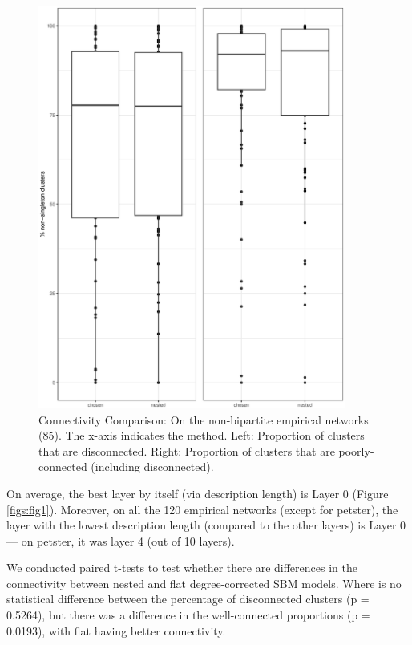 \documentclass[aps,pre,superscriptaddress]{article}
\begin{document}
\begin{figure}[ht]
	\centering
	\begin{subfloat}
		\centering
		\includegraphics[width=0.9\textwidth]{nested_sbm_compar.eps}
	\end{subfloat}
	\caption{Connectivity Comparison:
		On the non-bipartite empirical networks (85).
		The x-axis indicates the method.
		Left: Proportion of clusters that are disconnected.
		Right: Proportion of clusters that are poorly-connected (including disconnected).
	}
	\label{figs:fig3}
\end{figure}

On average, the best layer by itself (via description length) is Layer 0 (Figure \ref{figs:fig1}).
Moreover, on all the 120 empirical networks (except for petster), the layer with the lowest description length (compared to the other layers) is Layer 0 --- on petster, it was layer 4 (out of 10 layers).

We conducted paired t-tests to test whether there are differences in the connectivity between nested and flat degree-corrected SBM models.
Where is no statistical difference between the percentage of disconnected clusters (p = 0.5264), but there was a difference in the well-connected proportions (p = 0.0193), with flat having better connectivity.
\end{document}
